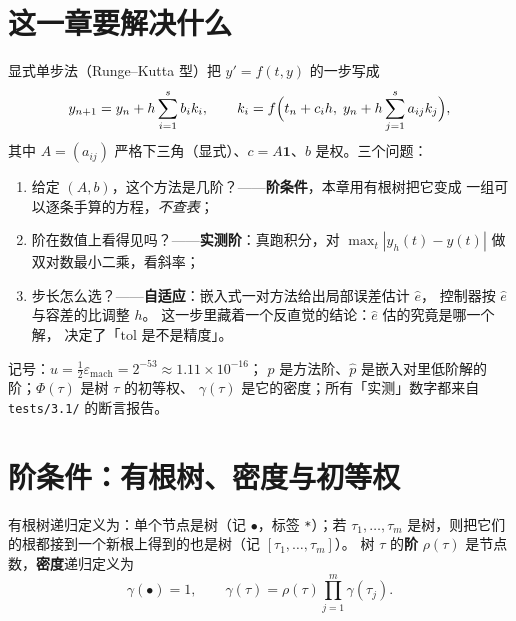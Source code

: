 

\section{这一章要解决什么}

显式单步法（Runge--Kutta 型）把 $y'=f(t,y)$ 的一步写成
\begin{equation}
  y_{n+1}=y_n+h\sum_{i=1}^{s}b_ik_i,\qquad
  k_i=f\Bigl(t_n+c_ih,\;y_n+h\sum_{j=1}^{s}a_{ij}k_j\Bigr),
  \label{eq:rk}
\end{equation}
其中 $A=(a_{ij})$ 严格下三角（显式）、$c=A\mathbf{1}$、$b$ 是权。三个问题：

\begin{enumerate}
  \item 给定 $(A,b)$，这个方法是几阶？——\textbf{阶条件}，本章用有根树把它变成
        一组可以逐条手算的方程，\emph{不查表}；
  \item 阶在数值上看得见吗？——\textbf{实测阶}：真跑积分，对
        $\max_t|y_h(t)-y(t)|$ 做双对数最小二乘，看斜率；
  \item 步长怎么选？——\textbf{自适应}：嵌入式一对方法给出局部误差估计 $\hat e$，
        控制器按 $\hat e$ 与容差的比调整 $h$。
        这一步里藏着一个反直觉的结论：$\hat e$ 估的究竟是哪一个解，
        决定了「$\mathrm{tol}$ 是不是精度」。
\end{enumerate}

记号：$u=\tfrac12\varepsilon_{\text{mach}}=2^{-53}\approx1.11\times10^{-16}$；
$p$ 是方法阶、$\hat p$ 是嵌入对里低阶解的阶；$\Phi(\tau)$ 是树 $\tau$ 的初等权、
$\gamma(\tau)$ 是它的密度；所有「实测」数字都来自 \texttt{tests/3.1/} 的断言报告。

\section{阶条件：有根树、密度与初等权}

\begin{definition}
有根树递归定义为：单个节点是树（记 $\bullet$，标签 \texttt{*}）；若 $\tau_1,\dots,\tau_m$
是树，则把它们的根都接到一个新根上得到的也是树（记 $[\tau_1,\dots,\tau_m]$）。
树 $\tau$ 的\textbf{阶} $\rho(\tau)$ 是节点数，\textbf{密度}递归定义为
\begin{equation}
  \gamma(\bullet)=1,\qquad
  \gamma(\tau)=\rho(\tau)\prod_{j=1}^{m}\gamma(\tau_j).
  \label{eq:gamma}
\end{equation}
\end{definition}

